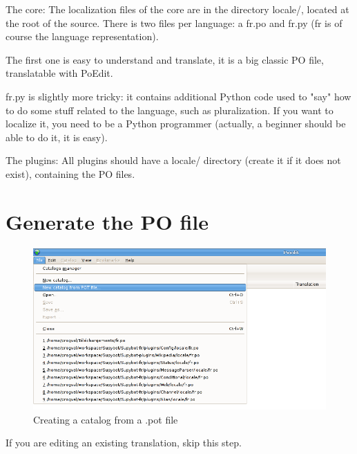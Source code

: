 \documentclass[a4paper,11pt]{article}
\begin{document}
    \begin{description}
      \item{The core}: The localization files of the core are in the
        directory locale/, located at the root of the source. There is two
        files per language: a fr.po and fr.py (fr is of course the language
        representation).
        
        The first one is  easy to understand and translate, it is a big
        classic PO file, translatable with PoEdit.
        
        fr.py is slightly more tricky: it contains additional Python code used
        to "say" how to do some stuff related to the language, such as
        pluralization. If you want to localize it, you need to be a Python
        programmer (actually, a beginner should be able to do it, it is easy).
        
      \item{The plugins}: All plugins should have a locale/ directory (create
        it if it does not exist), containing the PO files.
    \end{description}
    
  \section{Generate the PO file}
    \begin{figure}
      \begin{center}
        \includegraphics[scale=0.5]{pictures/new_catalog_from_POT_file.png}
        \caption{Creating a catalog from a .pot file}
        \label{fig:creating_a_catalog}
      \end{center}
    \end{figure}
    If you are editing an existing translation, skip this step.
    
\end{document}
